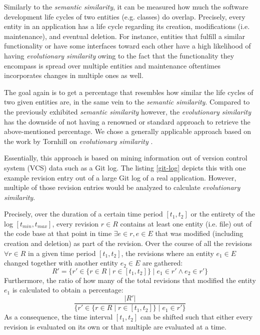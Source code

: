 \documentclass[12pt,a4paper]{report}
\begin{document}
Similarly to the \textit{semantic similarity}, it can be measured how much the
software development life cycles of two entities (e.g. classes) do overlap.
Precisely, every entity in an application has a life cycle regarding
its creation, modifications (i.e. maintenance), and eventual deletion.
For instance, entities that fulfill a similar functionality or have some
interfaces toward each other have a high likelihood of having
\textit{evolutionary similarity} owing to the fact that the functionality
they encompass is spread over multiple entities and maintenance oftentimes
incorporates changes in multiple ones as well.

The goal again is to get a percentage that resembles how similar the life cycles
of two given entities are, in the same vein to the \textit{semantic similarity}.
Compared to the previously exhibited \textit{semantic similarity} however,
the \textit{evolutionary similarity} has the downside of not having a renowned
or standard approach to retrieve the above-mentioned percentage.
We chose a generally applicable approach based on the work by Tornhill
on \textit{evolutionary similarity} \cite{tornhill2015crimescene}.

Essentially, this approach is based on mining information out of
version control system (VCS) data such as a Git log.
The listing \ref{git-log} depicts this with one example revision entry
out of a large Git log of a real application. However, multiple of those
revision entries would be analyzed to calculate \textit{evolutionary similarity}.

Precisely, over the duration of a certain time period \([t_1, t_2]\)
or the entirety of the log \([t_{min}, t_{max}]\), every revision \(r \in R\)
contains at least one entity (i.e. file) out of the code base at that point
in time \(\exists e \in r, e \in E\) that was modified
(including creation and deletion) as part of the revision.
Over the course of all the revisions \(\forall r \in R\) in a given time period
\([t_1, t_2]\), the revisions where an entity \(e_1 \in E\) changed together
with another entity \(e_2 \in E\) are gathered:
\[
  R' = \{ r' \in \{ r \in R \mid r \in [t_1, t_2] \} \mid e_1 \in r' \land e_2 \in r' \}
\]
Furthermore, the ratio of how many of the total revisions that modified
the entity \(e_1\) is calculated to obtain a percentage:
\[
  \frac{\vert R' \vert}{\{ r' \in \{ r \in R \mid r \in [t_1, t_2] \} \mid e_1 \in r' \}}
\]
As a consequence, the time interval \([t_1, t_2]\) can be shifted such that
either every revision is evaluated on its own or that multiple are evaluated at a time.
\end{document}
